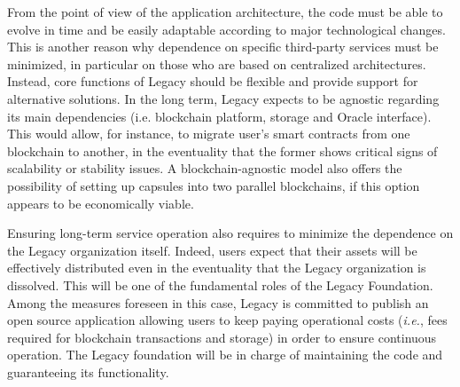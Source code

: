 From the point of view of the application architecture, the code must be able to evolve in time and be easily adaptable according to major technological changes. This is another reason why dependence on specific third-party services must be minimized, in particular on those who are based on centralized architectures. Instead, core functions of Legacy should be flexible and provide support for alternative solutions. In the long term, Legacy expects to be agnostic regarding its main dependencies (i.e. blockchain platform, storage and Oracle interface). This would allow, for instance, to migrate user’s smart contracts from one blockchain to another, in the eventuality that the former shows critical signs of scalability or stability issues. A blockchain-agnostic model also offers the possibility of setting up capsules into two parallel blockchains, if this option appears to be economically viable.    

Ensuring long-term service operation also requires to minimize the dependence on the Legacy organization itself. Indeed, users expect that their assets will be effectively distributed even in the eventuality that the Legacy organization is dissolved. 
This will be one of the fundamental roles of the Legacy Foundation. Among the measures foreseen in this case, Legacy is committed to publish an open source application allowing users to keep paying operational costs (\textit{i.e.}, fees required for blockchain transactions and storage) in order to ensure continuous operation. The Legacy foundation will be in charge of maintaining the code and guaranteeing its functionality.






